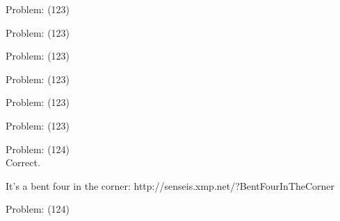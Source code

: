 \documentclass[11pt]{article}
\begin{document}
\begin{minipage}[t]{0.5\textwidth}
  {\centering
  
Problem: (123)\\
  }
\end{minipage}
\begin{minipage}[t]{0.5\textwidth}
  {\centering
  
Problem: (123)\\
  }
\end{minipage}
\begin{minipage}[t]{0.5\textwidth}
  {\centering
  
Problem: (123)\\
  }
\end{minipage}
\begin{minipage}[t]{0.5\textwidth}
  {\centering
  
Problem: (123)\\
  }
\end{minipage}
\begin{minipage}[t]{0.5\textwidth}
  {\centering
  
Problem: (123)\\
  }
\end{minipage}
\begin{minipage}[t]{0.5\textwidth}
  {\centering
  
Problem: (123)\\
  }
\end{minipage}
\begin{minipage}[t]{0.5\textwidth}
  {\centering
  
Problem: (124)\\
Correct.

It's a bent four in the corner: http://senseis.xmp.net/?BentFourInTheCorner\\
  }
\end{minipage}
\begin{minipage}[t]{0.5\textwidth}
  {\centering
  
Problem: (124)\\
  }
\end{minipage}
\end{document}
